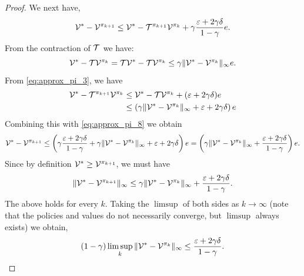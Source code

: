 \begin{proof}
    We next have,
    \begin{equation}\label{eq:approx_pi_8}
        \mathcal{V}^{*} - \mathcal{V}^{\pi_{k+1}} \leq \mathcal{V}^{*} -\mathcal{T}^{\pi_{k+1}}\mathcal{V}^{\pi_{k}} + \gamma \frac{\varepsilon + 2 \gamma \delta}{1 - \gamma}e.
    \end{equation}
    From the contraction of $\mathcal{T}$ we have:
    \begin{equation}\label{eq:approx_pi_contraction}
        \mathcal{V}^{*} - \mathcal{T} \mathcal{V}^{\pi_{k}} = \mathcal{T}\mathcal{V}^{*} - \mathcal{T} \mathcal{V}^{\pi_{k}} \leq \gamma \|\mathcal{V}^{*} - \mathcal{V}^{\pi_{k}}\|_\infty e.
    \end{equation}
    From \eqref{eq:approx_pi_3}, we have
    \begin{equation*}
    \begin{split}
        \mathcal{V}^{*} -\mathcal{T}^{\pi_{k+1}}\mathcal{V}^{\pi_{k}} &\leq \mathcal{V}^{*} - \mathcal{T}\mathcal{V}^{\pi_k} + (\varepsilon + 2 \gamma \delta) e \\
        &\leq \left(\gamma \|\mathcal{V}^{*} - \mathcal{V}^{\pi_{k}}\|_\infty + \varepsilon + 2 \gamma \delta\right)e
    \end{split}
    \end{equation*}
    Combining this with \eqref{eq:approx_pi_8} we obtain
    \begin{equation*}
        \mathcal{V}^{*} - \mathcal{V}^{\pi_{k+1}} \leq \left(\gamma \frac{\varepsilon + 2 \gamma \delta}{1 - \gamma} + \gamma \|\mathcal{V}^{*} - \mathcal{V}^{\pi_{k}}\|_\infty + \varepsilon + 2 \gamma \delta\right)e = \left(\gamma \|\mathcal{V}^{*} - \mathcal{V}^{\pi_{k}}\|_\infty + \frac{\varepsilon + 2 \gamma \delta}{1 - \gamma} \right)e.
    \end{equation*}
    Since by definition $\mathcal{V}^{*} \geq \mathcal{V}^{\pi_{k+1}}$, we must have
    \begin{equation*}
        \|\mathcal{V}^{*} - \mathcal{V}^{\pi_{k+1}}\|_\infty \leq \gamma \|\mathcal{V}^{*} - \mathcal{V}^{\pi_{k}}\|_\infty + \frac{\varepsilon + 2 \gamma \delta}{1 - \gamma}.
    \end{equation*}
    The above holds for every $k$. Taking the $ \limsup$ of both sides as $k \to \infty$ (note that the policies and values do not necessarily converge, but $ \limsup$ always exists) we obtain,
    \begin{equation*}
        (1-\gamma)\limsup_k\|\mathcal{V}^{*} - \mathcal{V}^{\pi_{k}}\|_\infty \leq  \frac{\varepsilon + 2 \gamma \delta}{1 - \gamma}.
    \end{equation*}
\end{proof}

